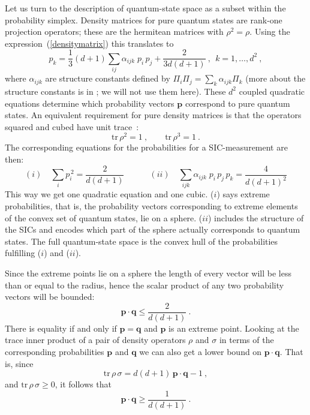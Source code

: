\documentclass[letterpaper,11pt]{article}
\begin{document}
Let us turn to the description of quantum-state space as a subset within the probability simplex. Density matrices for pure quantum states are rank-one projection operators; these are the hermitean matrices with $\rho^2=\rho$. Using the expression~(\ref{densitymatrix}) this translates to
%
\begin{equation}
 p_k=\frac{1}{3}(d+1)\sum_{ij}\alpha_{ijk}\; p_i\,p_ j +\frac{2}{3d(d+1)} \ , \ \ k=1,\dots,d^2 \ ,
\end{equation}
%
where $\alpha_{ijk}$ are structure constants defined by $\Pi_i \Pi_j=\sum_k\alpha_{ijk}\Pi_k$ (more about the structure constants is in \cite{Fuchs&Schack}; we will not use them here). These $d^2$ coupled quadratic equations determine which probability vectors $\mathbf{p}$ correspond to pure quantum states. An equivalent requirement for pure density matrices is that the operators squared and cubed have unit trace~\cite{Jones05}:
%
\begin{equation} \label{purecondition}
 \textrm{tr}\, \rho^2 = 1 \ , \qquad
 \textrm{tr}\, \rho^3 = 1 \ .
\end{equation}
%
The corresponding equations for the probabilities for a SIC-measurement are then:
%
\begin{equation} \label{extremecondition}
  (i) \quad \sum_i p_i^{\,2} = \frac{2}{d(d+1)} \qquad\quad
  (ii) \quad  \sum_{ijk} \alpha_{ijk} \;p_i\,p_j\,p_k =  \frac{4}{d(d+1)^2}
\end{equation}
%
This way we get one quadratic equation and one cubic. ($i$) says extreme probabilities, that is, the probability vectors corresponding to extreme elements of the convex set of quantum states, lie on a sphere. ($ii$) includes the structure of the SICs and encodes which part of the sphere actually corresponds to quantum states. The full quantum-state space is the convex hull of the probabilities fulfilling ($i$) and ($ii$).

Since the extreme points lie on a sphere the length of every vector will be less than or equal to the radius, hence the scalar product of any two probability vectors will be bounded:
%
\begin{equation} \label{upperbound}
 \mathbf{p\cdot q} \leq \frac{2}{d(d+1)}  \  .
\end{equation}
%
There is equality if and only if $\mathbf{p}=\mathbf{q}$ and $\mathbf p$ is an extreme point. Looking at the trace inner product of a pair of density operators $\rho$ and $\sigma$ in terms of the corresponding probabilities $\mathbf{p}$ and $\mathbf{q}$ we can also get a lower bound on $\mathbf{p\cdot q}$.  That is, since
%
\begin{equation} \label{tracescalarproduct}
  \textrm{tr}\,\rho\,\sigma = d(d+1)\,\mathbf{p\cdot q} -1 \ ,
\end{equation}
%
and $\textrm{tr}\,\rho\,\sigma \geq 0$, it follows that
%
\begin{equation} \label{lowerbound}
  \mathbf{p\cdot q} \geq \frac{1}{d(d+1)} \ .
\end{equation}
\end{document}
